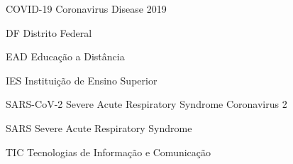 \documentclass[
	arial,
	12pt,				%
	openright,			%
	twoside,			%
	a4paper,			%
	chapter=TITLE,		%
	english,			%
	french,				%
	spanish,			%
	brazil,				%
	]{abntex2}
\begin{document}

\frenchspacing 


\imprimircapa

\imprimirfolhaderosto


\cleardoublepage

\cleardoublepage

\begin{siglas}
  \item[COVID-19] Coronavirus Disease 2019
  \item[DF] Distrito Federal
  \item[EAD] Educação a Distância
  \item[IES] Instituição de Ensino Superior
  \item[SARS-CoV-2] Severe Acute Respiratory Syndrome Coronavirus 2
  \item[SARS] Severe Acute Respiratory Syndrome
  \item[TIC] Tecnologias de Informação e Comunicação
\end{siglas}


\tableofcontents*
\cleardoublepage
\end{document}
